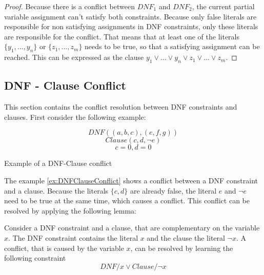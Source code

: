 \begin{proof}
Because there is a conflict between $DNF_1$ and $DNF_2$, the current partial variable assignment can't satisfy both constraints. Because only false literals are responsible for non satisfying assignments in DNF constraints, only these literals are responsible for the conflict. That means that at least one of the literals $\{y_1,...,y_n\}$ or $\{z_1,...,z_m\}$ needs to be true, so that a satisfying assignment can be reached. This can be expressed as the clause $y_1 \vee ... \vee y_n \vee z_1 \vee ... \vee z_m$.
\end{proof}

\subsection{DNF - Clause Conflict}

This section contains the conflict resolution between DNF constraints and clauses. First consider the following example:

\begin{example}
\begin{leftbar}
\begin{displaymath}
DNF((a,b,c),(e,f,g))
\end{displaymath}
\begin{displaymath}
Clause(c,d,\neg e)
\end{displaymath}
\begin{displaymath}
c = 0, d = 0
\end{displaymath}
\end{leftbar}
\caption{Example of a DNF-Clause conflict}
\label{ex:DNFClauseConflict}
\end{example}

The example \ref{ex:DNFClauseConflict} shows a conflict between a DNF constraint and a clause. Because the literals $\{c,d\}$ are already false, the literal $e$ and $\neg e$ need to be true at the same time, which causes a conflict. This conflict can be resolved by applying the following lemma:



\begin{lemma}
\begin{leftbar}
Consider a DNF constraint and a clause, that are complementary on the variable $x$. The DNF constraint contains the literal $x$ and the clause the literal $\neg x$. A conflict, that is caused by the variable $x$, can be resolved by learning the following constraint
\begin{displaymath}
DNF / x \vee Clause / \neg x
\end{displaymath}
\end{leftbar}
\label{le:DNFClauseConflict}
\end{lemma}

